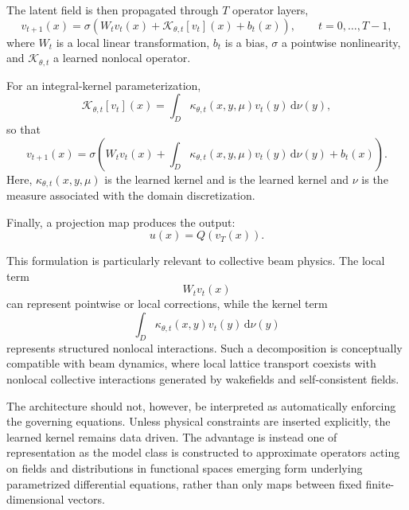 \documentclass[11pt,a4paper]{article}
\providecommand{\dd}{\,\mathrm{d}}
\begin{document}
\begin{sloppypar}
The latent field is then propagated through $T$ operator layers,
\begin{equation}
v_{t+1}(x)
=
\sigma
\left(
W_t v_t(x)
+
\mathcal{K}_{\theta,t}[v_t](x)
+
b_t(x)
\right),
\qquad
t=0,\ldots,T-1,
\label{eq:NO_layer_abstract}
\end{equation}
where $W_t$ is a local linear transformation,
$b_t$ is a bias,
$\sigma$ a pointwise nonlinearity,
and $\mathcal{K}_{\theta,t}$ a learned nonlocal operator.

For an integral-kernel parameterization,
\begin{equation}
\mathcal{K}_{\theta,t}[v_t](x)
=
\int_D
\kappa_{\theta,t}
(x,y,\mu)
v_t(y)
\dd\nu(y),
\label{eq:NO_kernel_operator}
\end{equation}
so that
\begin{equation}
v_{t+1}(x)
=
\sigma
\left(
W_t v_t(x)
+
\int_D
\kappa_{\theta,t}(x,y,\mu)
v_t(y)
\dd\nu(y)
+
b_t(x)
\right).
\label{eq:NO_layer_full}
\end{equation}
Here, $\kappa_{\theta,t}(x,y,\mu)$ is the learned kernel and
is the learned kernel and $\nu$ is the measure associated with the domain discretization.

Finally, a projection map produces the output:
\begin{equation}
u(x)
=
Q(v_T(x)).
\label{eq:NO_project}
\end{equation}

This formulation is particularly relevant to collective beam physics. The local term
\begin{equation}
W_t v_t(x)
\end{equation}
can represent pointwise or local corrections, while the kernel term
\begin{equation}
\int_D
\kappa_{\theta,t}(x,y)
v_t(y)
\dd\nu(y)
\end{equation}
represents structured nonlocal interactions. Such a decomposition is conceptually compatible with beam dynamics, where local lattice transport coexists with nonlocal collective interactions generated by wakefields and self-consistent fields.

The architecture should not, however, be interpreted as automatically enforcing the governing equations. Unless physical constraints are inserted explicitly, the learned kernel remains data driven. The advantage is instead one of representation as the model class is constructed to approximate operators acting on fields and distributions in functional spaces emerging form underlying parametrized differential equations, rather than only maps between fixed finite-dimensional vectors.


\end{sloppypar}
\end{document}
